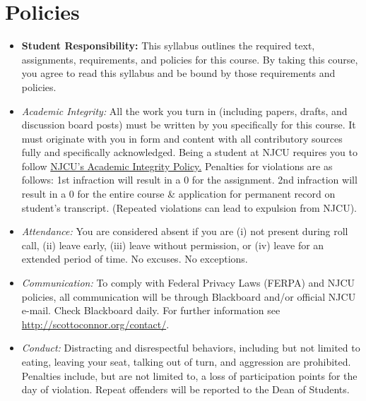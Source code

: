\documentclass[article,oneside]{memoir}
\begin{document}
\section{Policies}

\begin{itemize}

\item \textbf{Student Responsibility:} This syllabus outlines the required text, assignments, requirements, and policies for this course. By taking this course, you agree to read this syllabus and be bound by those requirements and policies. 

 \item \textit{Academic Integrity:} All the work you turn in (including papers, drafts, and discussion board posts) must be written by you specifically for this course. It must originate with you in form and content with all contributory sources fully and specifically acknowledged. Being a student at NJCU requires you to follow \href{http://scottoconnor.org/resources/Plagiarism.pdf}{NJCU's Academic Integrity Policy.} Penalties for violations are as follows: 1st infraction will result in a 0 for the assignment.  2nd infraction will result in a 0 for the entire course \& application for permanent record on student's transcript. (Repeated violations can lead to expulsion from NJCU). 

\item \textit{Attendance:} You are considered absent if you are (i) not present during roll call, (ii) leave early, (iii) leave without permission, or (iv) leave for an extended period of time. No excuses. No exceptions.



\item \textit{Communication:} To comply with Federal Privacy Laws (FERPA) and NJCU policies, all communication will be through Blackboard and/or official NJCU e-mail. Check Blackboard daily. For further information see \href{http://scottoconnor.org/contact/}{http://scottoconnor.org/contact/}.

\item \textit{Conduct:} Distracting and disrespectful behaviors, including but not limited to eating, leaving your seat, talking out of turn, and aggression are prohibited. Penalties include, but are not limited to, a loss of participation points for the day of violation. Repeat offenders will be reported to the Dean of Students. 


\end{itemize}
\end{document}
